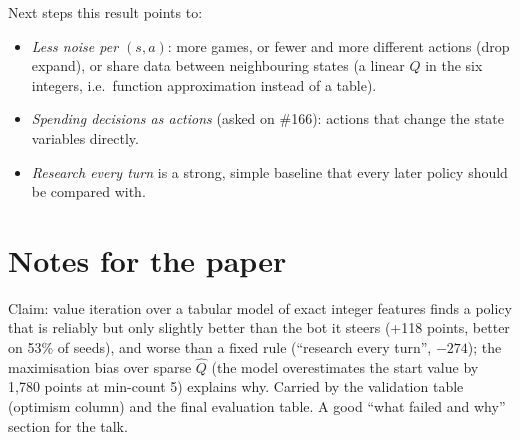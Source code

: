 \documentclass{../polyexp}
\begin{document}
Next steps this result points to:
\begin{itemize}
  \item \emph{Less noise per $(s,a)$}: more games, or fewer and more different actions (drop expand), or share data
        between neighbouring states (a linear $Q$ in the six integers, i.e.\ function approximation instead of a
        table).
  \item \emph{Spending decisions as actions} (asked on \#166): actions that change the state variables directly.
  \item \emph{Research every turn} is a strong, simple baseline that every later policy should be compared with.
\end{itemize}

\section{Notes for the paper}
Claim: value iteration over a tabular model of exact integer features finds a policy that is reliably but only
slightly better than the bot it steers (+118 points, better on 53\% of seeds), and worse than a fixed rule
(``research every turn'', $-274$); the maximisation bias over sparse $\hat Q$ (the model overestimates the start
value by 1{,}780 points at min-count 5) explains why. Carried by the validation table (optimism column) and the
final evaluation table. A good ``what failed and why'' section for the talk.

\end{document}
